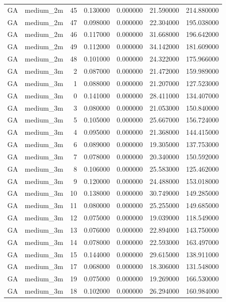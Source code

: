 \begin{tabular}{llrrrrr}
GA & medium_2m & 45 & 0.130000 & 0.000000 & 21.590000 & 214.880000 \\
GA & medium_2m & 47 & 0.098000 & 0.000000 & 22.304000 & 195.038000 \\
GA & medium_2m & 46 & 0.117000 & 0.000000 & 31.668000 & 196.642000 \\
GA & medium_2m & 49 & 0.112000 & 0.000000 & 34.142000 & 181.609000 \\
GA & medium_2m & 48 & 0.101000 & 0.000000 & 24.322000 & 175.966000 \\
GA & medium_3m & 2 & 0.087000 & 0.000000 & 21.472000 & 159.989000 \\
GA & medium_3m & 1 & 0.088000 & 0.000000 & 21.207000 & 127.523000 \\
GA & medium_3m & 0 & 0.141000 & 0.000000 & 28.411000 & 134.407000 \\
GA & medium_3m & 3 & 0.080000 & 0.000000 & 21.053000 & 150.840000 \\
GA & medium_3m & 5 & 0.105000 & 0.000000 & 25.667000 & 156.724000 \\
GA & medium_3m & 4 & 0.095000 & 0.000000 & 21.368000 & 144.415000 \\
GA & medium_3m & 6 & 0.089000 & 0.000000 & 19.305000 & 137.753000 \\
GA & medium_3m & 7 & 0.078000 & 0.000000 & 20.340000 & 150.592000 \\
GA & medium_3m & 8 & 0.106000 & 0.000000 & 25.583000 & 125.462000 \\
GA & medium_3m & 9 & 0.120000 & 0.000000 & 24.488000 & 153.018000 \\
GA & medium_3m & 10 & 0.138000 & 0.000000 & 30.749000 & 149.285000 \\
GA & medium_3m & 11 & 0.080000 & 0.000000 & 25.255000 & 149.685000 \\
GA & medium_3m & 12 & 0.075000 & 0.000000 & 19.039000 & 118.549000 \\
GA & medium_3m & 13 & 0.076000 & 0.000000 & 22.894000 & 143.750000 \\
GA & medium_3m & 14 & 0.078000 & 0.000000 & 22.593000 & 163.497000 \\
GA & medium_3m & 15 & 0.144000 & 0.000000 & 29.615000 & 138.911000 \\
GA & medium_3m & 17 & 0.068000 & 0.000000 & 18.306000 & 131.548000 \\
GA & medium_3m & 19 & 0.075000 & 0.000000 & 19.269000 & 166.530000 \\
GA & medium_3m & 18 & 0.102000 & 0.000000 & 26.294000 & 160.984000 \\

\end{tabular}
